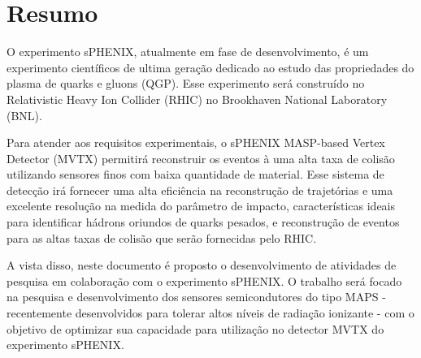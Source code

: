\chapter*{Resumo}

O experimento sPHENIX, atualmente em fase de desenvolvimento, é um experimento científicos de ultima geração dedicado ao estudo das propriedades do plasma de quarks e gluons (QGP). Esse experimento será construído no Relativistic Heavy Ion Collider (RHIC) no Brookhaven National Laboratory (BNL). 

Para atender aos requisitos experimentais, o sPHENIX  MASP-based Vertex Detector (MVTX) permitirá reconstruir os eventos à uma alta taxa de colisão utilizando sensores finos com baixa quantidade de material. Esse sistema de detecção irá fornecer uma alta eficiência na reconstrução de trajetórias e uma excelente resolução na medida do parâmetro de impacto, características ideais para identificar hádrons oriundos de quarks pesados, e reconstrução de eventos para as altas taxas de colisão que serão fornecidas pelo RHIC.

A vista disso, neste documento é proposto o desenvolvimento de atividades de pesquisa em colaboração com o experimento sPHENIX. O trabalho será focado na pesquisa e desenvolvimento dos sensores semicondutores do tipo MAPS - recentemente desenvolvidos para tolerar altos níveis de radiação ionizante - com o objetivo de optimizar sua capacidade para utilização no detector MVTX do experimento sPHENIX.

